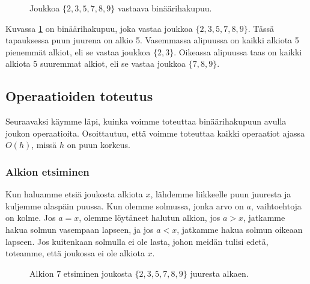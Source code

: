 \begin{figure}
\center
{}
\caption{Joukkoa $\{2,3,5,7,8,9\}$ vastaava binäärihakupuu.}
\label{fig:bihpuu}
\end{figure}

Kuvassa \ref{fig:bihpuu} on binäärihakupuu,
joka vastaa joukkoa $\{2,3,5,7,8,9\}$.
Tässä tapauksessa puun juurena on alkio 5.
Vasemmassa alipuussa on kaikki alkiota 5
pienemmät alkiot, eli se vastaa joukkoa $\{2,3\}$.
Oikeassa alipuussa taas on kaikki alkiota 5
suuremmat alkiot, eli se vastaa joukkoa $\{7,8,9\}$.

\subsection{Operaatioiden toteutus}

Seuraavaksi käymme läpi, kuinka voimme toteuttaa
binäärihakupuun avulla joukon operaatioita.
Osoittautuu, että voimme toteuttaa kaikki
operaatiot ajassa $O(h)$, missä $h$ on puun korkeus.

\subsubsection{Alkion etsiminen}

Kun haluamme etsiä joukosta alkiota $x$, lähdemme liikkeelle
puun juuresta ja kuljemme alaspäin puussa.
Kun olemme solmussa, jonka arvo on $a$,
vaihtoehtoja on kolme.
Jos $a=x$, olemme löytäneet halutun alkion,
jos $a>x$, jatkamme hakua solmun vasempaan lapseen,
ja jos $a<x$, jatkamme hakua solmun oikeaan lapseen.
Jos kuitenkaan solmulla ei ole lasta,
johon meidän tulisi edetä, toteamme,
että joukossa ei ole alkiota $x$.

\begin{figure}
\center
{}
\caption{Alkion $7$ etsiminen joukosta $\{2,3,5,7,8,9\}$ juuresta alkaen.}
\label{fig:bihets}
\end{figure}

